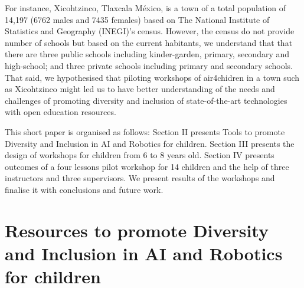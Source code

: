 \documentclass[conference]{IEEEtran}
\begin{document}
For instance, Xicohtzinco, Tlaxcala M\'exico, is a town of a total population of 14,197 (6762 males and 7435 females) based on The National Institute of Statistics and Geography (INEGI)'s census.
However, the census do not provide number of schools but based on the current habitants, we understand that that there are three public schools including kinder-garden, primary, secondary and high-school; and three private schools including primary and secondary schools. 
That said, we hypothesised that piloting workshops of air4chidren in a town such as Xicohtzinco might led us to have better understanding of the needs and challenges of promoting diversity and inclusion of state-of-the-art technologies with open education resources.

This short paper is organised as follows:
Section II presents Tools to promote Diversity and Inclusion in AI and Robotics for children.
Section III presents the design of workshops for children from 6 to 8 years old.
Section IV presents outcomes of a four lessons pilot workshop for 14 children and the help of three instructors and three supervisors. 
We present results of the workshops and finalise it with conclusions and future work.


\section{Resources to promote Diversity and Inclusion in AI and Robotics for children}
\end{document}
